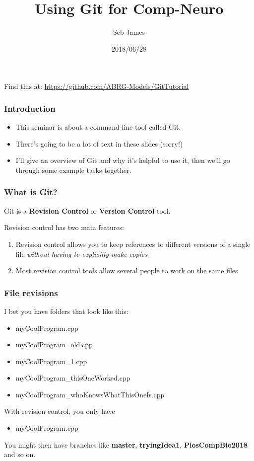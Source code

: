\documentclass{beamer}
\title{Using Git for Comp-Neuro}
\author{Seb James}
\institute{ABRG Sheffield Internal Seminar}
\date{2018/06/28}
\begin{document}
\begin{frame}
  \titlepage %
  Find this at: \url{https://github.com/ABRG-Models/GitTutorial}
\end{frame}

\begin{frame}
  \frametitle{Introduction}
  \begin{itemize}
    \item This seminar is about a command-line tool called Git.

    \item There's going to be a lot of \alert{text} in these slides (sorry!)

    \item I'll give an overview of Git and why it's helpful to use it, then we'll go
      through some example tasks together.
  \end{itemize}
\end{frame}

\begin{frame}
  \frametitle{What is Git?}
  Git is a \textbf{Revision Control} or \textbf{Version Control} tool.

  Revision control has two main features:

  \begin{enumerate}
    \pause \item Revision control allows you to keep references to different versions of a
      single file \emph{without having to explicitly make copies}
      \pause \item Most revision control tools allow several people to work
      on the same files %
  \end{enumerate}
\end{frame}

\begin{frame}
  \frametitle{File revisions}
  I bet you have folders that look like this:
  \pause \begin{itemize}
      \item myCoolProgram.cpp
      \pause \item myCoolProgram\_old.cpp
      \pause \item myCoolProgram\_1.cpp
      \pause \item myCoolProgram\_thisOneWorked.cpp
      \item myCoolProgram\_whoKnowsWhatThisOneIs.cpp
  \end{itemize}
  \pause With revision control, you only have
  \begin{itemize}
  \item myCoolProgram.cpp
  \end{itemize}
  \pause You might then have \alert{branches} like \textbf{master},
  \textbf{tryingIdea1}, \textbf{PlosCompBio2018} and so on.
\end{frame}
\end{document}
